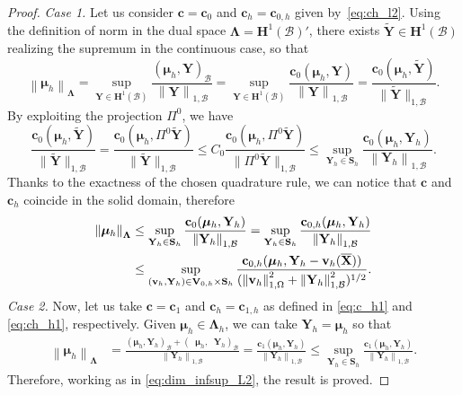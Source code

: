 \documentclass[oneside]{amsart} %
\newcommand{\norm}[1]{\left\lVert#1\right\rVert}
\DeclareMathOperator{\grads}{\boldsymbol\nabla_s}
\newcommand\Hub{\mathbf{H}^1(\B)} %
\newcommand\Hubd{\Hub'} %
\newcommand\B{\mathcal B} %
\renewcommand\v{\mathbf{v}} %
\renewcommand\c{\mathbf{c}} %
\renewcommand\S{\mathbf{S}} %
\newcommand\X{\mathbf{X}} %
\newcommand\Xbar{\overline{\X}} %
\newcommand\Y{\mathbf{Y}} %
\newcommand\Ytilde{\tilde{\mathbf{Y}}} %
\newcommand\LL{{\boldsymbol{\Lambda}}} %
\newcommand\Vline{\mathbf{V}} %
\newcommand\Sline{\S} %
\newcommand\mmu{{\boldsymbol\mu}} %
\newcommand\Vdiv{\Vline_{0,h}} %
\newcommand\projLdue{\Pi^0} %
\newcommand\DB{\begin{color}{black}}
\newcommand\BD{\end{color}}
\begin{document}
	\begin{proof}
		\textit{Case 1.} Let us consider $\c=\c_0$ and $\c_h=\c_{0,h}$ given by~\eqref{eq:ch_l2}. Using the definition of norm in the dual space $\LL=\Hubd$, there exists $\Ytilde\in\Hub$ realizing the supremum in the continuous case, so that
		\begin{equation}
			\norm{\mmu_h}_{\LL}
			= \sup_{\Y\in\Hub} \frac{(\mmu_h,\Y)_\B}{\norm{\Y}_{1,\B}}
			= \sup_{\Y\in\Hub} \frac{\c_0(\mmu_h,\Y)}{\norm{\Y}_{1,\B}}
			= \frac{\c_0(\mmu_h,\Ytilde)}{\|\Ytilde\|_{1,\B}}.
		\end{equation}
		By exploiting the projection $\projLdue$, we have
		\begin{equation}
			\frac{\c_0(\mmu_h,\Ytilde)}{\|\Ytilde\|_{1,\B}}
			= \frac{\c_0(\mmu_h,\projLdue\Ytilde)}{\|\Ytilde\|_{1,\B}}
			\le C_0 \frac{\c_0(\mmu_h,\projLdue\Ytilde)}{\|\projLdue\Ytilde\|_{1,\B}}
			\le \sup_{\Y_h\in\Sline_h} \frac{\c_0(\mmu_h,\Y_h)}{\norm{\Y_h}_{1,\B}}.
		\end{equation}
		Thanks to the exactness of the chosen quadrature rule, we can notice that $\c$ and $\c_h$ coincide in the solid domain, therefore
		\begin{equation}\label{eq:dim_infsup_L2}
			\begin{aligned}
				\norm{\mmu_h}_{\LL} &\le \sup_{\Y_h\in\Sline_h} \frac{\c_0(\mmu_h,\Y_h)}{\norm{\Y_h}_{1,\B}} =  \sup_{\Y_h\in\Sline_h} \frac{\c_{0,h}(\mmu_h,\Y_h)}{\norm{\Y_h}_{1,\B}}\\
				&\le \sup_{(\v_h,\Y_h)\in\Vdiv \times \Sline_h}
				\frac{\c_{0,h}(\mmu_h,\DB\Y_h-\v_h(\Xbar)\BD)}{(\norm{\v_h}^2_{1,\Omega} + \norm{\Y_h}^2_{1,\B})^{1/2}}.
			\end{aligned}
		\end{equation}
		\textit{Case 2.} Now, let us take $\c=\c_1$ and $\c_h=\c_{1,h}$ as defined in \eqref{eq:c_h1} and \eqref{eq:ch_h1}, respectively. Given $\mmu_h\in\LL_h$, we can take $\Y_h=\mmu_h$ so that
		\begin{equation}
			\begin{aligned}
				\norm{ \mmu_h }_{\LL} &= \frac{(\mmu_h,\Y_h)_\B +(\grads\mmu_h,\grads\Y_h)_\B}{\norm{\Y_h}_{1,\B}} = \frac{\c_1(\mmu_h,\Y_h)}{\norm{\Y_h}_{1,\B}}
				\le \sup_{\Y_h\in\Sline_h} \frac{\c_1(\mmu_h,\Y_h)}{\norm{\Y_h}_{1,\B}}.
			\end{aligned}
		\end{equation}
		Therefore, working as in \eqref{eq:dim_infsup_L2}, the result is proved.
	\end{proof}
	
\end{document}
